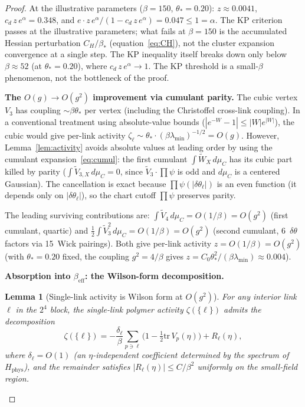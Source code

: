 \documentclass[11pt]{article}
\newtheorem{lemma}[theorem]{Lemma}
\theoremstyle{definition}
\newcommand{\tr}{\mathrm{tr}}
\begin{document}
\begin{proof}
At the illustrative parameters ($\beta=150$,
$\theta_*=0.20$):
$z\approx 0.0041$,
$c_d\,z\,e^\alpha=0.348$, and
$e\cdot z\,e^\alpha/(1-c_d\,z\,e^\alpha)=0.047\le 1=\alpha$.
The KP criterion passes at the illustrative parameters;
what fails at $\beta=150$ is the accumulated
Hessian perturbation $C_H/\beta_*$ (equation~\eqref{eq:CH}),
not the cluster expansion convergence at a single step.
The KP inequality itself breaks down only below
$\beta\approx 52$ (at $\theta_*=0.20$), where
$c_d\,z\,e^\alpha\to 1$.  The KP threshold is a
small-$\beta$ phenomenon, not the bottleneck of the proof.

\textbf{The $O(g){\to}O(g^2)$ improvement via cumulant parity.}
The cubic vertex $V_3$ has coupling $\sim\beta\theta_*$ per vertex
(including the Christoffel cross-link coupling).  In a conventional
treatment using absolute-value bounds ($|e^{-W}-1|\le|W|e^{|W|}$),
the cubic would give per-link activity
$\zeta_\ell\sim\theta_*\cdot(\beta\lambda_{\min})^{-1/2}=O(g)$.
However, Lemma~\ref{lem:activity} avoids absolute values at leading
order by using the cumulant expansion~\eqref{eq:cumul}: the first
cumulant $\int\widetilde{W}_X\,d\mu_C$ has its cubic part killed by
parity ($\int\widetilde{V}_{3,X}\,d\mu_C=0$, since
$\widetilde{V}_3\cdot\prod\psi$ is odd and $d\mu_C$ is a centered
Gaussian).  The cancellation is exact because $\prod\psi(|\delta\theta_\ell|)$
is an even function (it depends only on $|\delta\theta_\ell|$), so the
chart cutoff $\prod\psi$ preserves parity.

The leading surviving contributions are:
$\int\widetilde{V}_{4}\,d\mu_C=O(1/\beta)=O(g^2)$ (first cumulant, quartic)
and
$\frac{1}{2}\int\widetilde{V}_{3}^2\,d\mu_C=O(1/\beta)=O(g^2)$ (second
cumulant, 6~$\delta\theta$ factors via 15~Wick pairings).
Both give per-link activity $z=O(1/\beta)=O(g^2)$ (with
$\theta_*=0.20$ fixed, the coupling $g^2=4/\beta$ gives
$z=C_0\theta_*^2/(\beta\lambda_{\min})\approx 0.004$).

\textbf{Absorption into $\beta_{\mathrm{eff}}$:
the Wilson-form decomposition.}

\begin{lemma}[Single-link activity is Wilson form at $O(g^2)$]%
\label{lem:wilson-form}
For any interior link $\ell$ in the $2^4$ block, the single-link
polymer activity $\zeta(\{\ell\})$ admits the decomposition
\begin{equation}\label{eq:wilson-decomp}
\zeta(\{\ell\})
=-\frac{\delta_\ell}{\beta}\sum_{p\ni\ell}
\bigl(1-\tfrac{1}{2}\tr\,V_p(\eta)\bigr)
+R_\ell(\eta),
\end{equation}
where $\delta_\ell=O(1)$ (an $\eta$-independent coefficient determined
by the spectrum of $H_{\mathrm{phys}}$), and the remainder satisfies
$|R_\ell(\eta)|\le C/\beta^2$ uniformly on the small-field region.
\end{lemma}


\end{proof}
\end{document}
